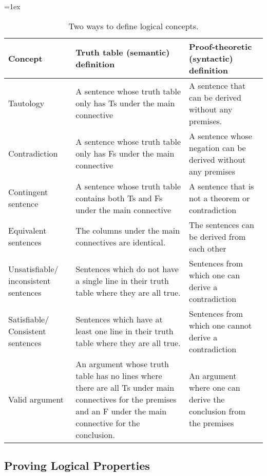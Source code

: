 \begin{table}[H]
\tabulinesep=1ex
\begin{tabu}{X[.5,c,m] ||X[1,l,m] |X[1,l,m]}
\textbf{Concept} 		&	\textbf{Truth table (semantic) definition} 	&	\textbf{Proof-theoretic (syntactic) definition} \\ \hline \hline

Tautology   &	A sentence whose truth table only has Ts under the main connective & A sentence that can be derived without any premises.	 \\ \hline
 
Contradiction		&	A sentence whose truth table only has Fs under the main connective  &	A sentence whose negation can be derived without any premises\\ \hline

Contingent sentence	&	A sentence whose truth table contains both Ts and Fs under the main connective & A sentence that is not a theorem or contradiction \\ \hline

Equivalent sentences &	The columns under the main connectives are identical.& The sentences can be derived from each other	\\ \hline

Unsatisfiable/ inconsistent sentences	&	Sentences which do not have a single line in their truth table where they are all true.	& Sentences  from which one can derive a contradiction \\ \hline

Satisfiable/ Consistent sentences	&	Sentences which have at least one line in their truth table where they are all true. & Sentences from which one cannot derive a contradiction	\\ \hline

Valid argument		&	An argument whose truth table has no lines where there are all Ts under main connectives for the premises and an F under the main connective for the conclusion.  & An argument where one can derive the conclusion from the premises	\\ 
\end{tabu}
\caption{Two ways to define logical concepts.}
\label{table:truth_tables_or_derivations}
\end{table}

\subsection{ Proving Logical Properties}

